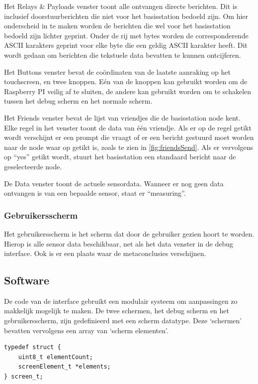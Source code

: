 Het Relays \& Payloads venster toont alle ontvangen directe berichten. Dit is inclusief doorstuurberichten die niet voor het basisstation bedoeld zijn. Om hier onderscheid in te maken worden de berichten die wel voor het basisstation bedoeld zijn lichter geprint. Onder de rij met bytes worden de corresponderende ASCII karakters geprint voor elke byte die een geldig ASCII karakter heeft. Dit wordt gedaan om berichten die tekstuele data bevatten te kunnen ontcijferen.

Het Buttons venster bevat de coördinaten van de laatste aanraking op het touchscreen, en twee knoppen. Eén van de knoppen kan gebruikt worden om de Raspberry PI veilig af te sluiten, de andere kan gebruikt worden om te schakelen tussen het debug scherm en het normale scherm.

Het Friends venster bevat de lijst van vriendjes die de basisstation node kent. Elke regel in het venster toont de data van één vriendje. Als er op de regel getikt wordt verschijnt er een prompt die vraagt of er een bericht gestuurd moet worden naar de node waar op getikt is, zoals te zien in \autoref{fig:friendsSend}. Als er vervolgens op ``yes'' getikt wordt, stuurt het basisstation een standaard bericht naar de geselecteerde node.

De Data venster toont de actuele sensordata. Wanneer er nog geen data ontvangen is van een bepaalde sensor, staat er ``measuring''.

\subsubsection*{Gebruikersscherm}
Het gebruikersscherm is het scherm dat door de gebruiker gezien hoort te worden. Hierop is alle sensor data beschikbaar, net als het data venster in de debug interface. Ook is er een plaats waar de metaconclusies verschijnen.




\subsection{Software}
De code van de interface gebruikt een modulair systeem om aanpassingen zo makkelijk mogelijk te maken. De twee schermen, het debug scherm en het gebruikersscherm, zijn gedefinieerd met een scherm datatype.
Deze `schermen' bevatten vervolgens een array van `scherm elementen'.

\begin{minipage}{\textwidth}
    \begin{lstlisting}[caption={Het datatype van de schermen},captionpos=b,label={lst:screen_t},style=c,xleftmargin=.\textwidth,xrightmargin=.\textwidth]
typedef struct {
    uint8_t elementCount;
    screenElement_t *elements;
} screen_t;
    \end{lstlisting}
\end{minipage}

